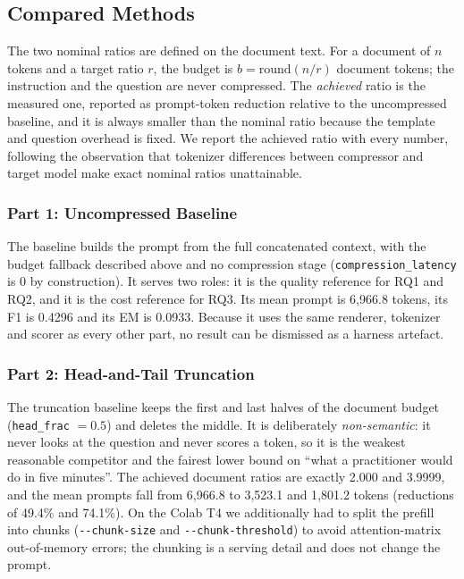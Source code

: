 \documentclass[10pt,a4paper,twocolumn]{article}
\begin{document}
\subsection{Compared Methods}

The two nominal ratios are defined on the document text. For a document of $n$
tokens and a target ratio $r$, the budget is $b=\mathrm{round}(n/r)$ document
tokens; the instruction and the question are never compressed. The \emph{achieved}
ratio is the measured one, reported as prompt-token reduction relative to the
uncompressed baseline, and it is always smaller than the nominal ratio because the
template and question overhead is fixed. We report the achieved ratio with every
number, following the observation that tokenizer differences between compressor
and target model make exact nominal ratios unattainable.

\subsubsection{Part 1: Uncompressed Baseline}

The baseline builds the prompt from the full concatenated context, with the budget
fallback described above and no compression stage (\texttt{compression\_latency}
is 0 by construction). It serves two roles: it is the quality reference for RQ1
and RQ2, and it is the cost reference for RQ3. Its mean prompt is 6{,}966.8
tokens, its F1 is 0.4296 and its EM is 0.0933. Because it uses the same renderer,
tokenizer and scorer as every other part, no result can be dismissed as a
harness artefact.

\subsubsection{Part 2: Head-and-Tail Truncation}

The truncation baseline keeps the first and last halves of the document budget
(\texttt{head\_frac} $=0.5$) and deletes the middle. It is deliberately
\emph{non-semantic}: it never looks at the question and never scores a token, so it
is the weakest reasonable competitor and the fairest lower bound on ``what a
practitioner would do in five minutes''. The achieved document ratios are exactly
2.000 and 3.9999, and the mean prompts fall from 6{,}966.8 to 3{,}523.1 and
1{,}801.2 tokens (reductions of 49.4\% and 74.1\%). On the Colab T4 we additionally
had to split the prefill into chunks (\texttt{-{}-chunk-size} and
\texttt{-{}-chunk-threshold}) to avoid attention-matrix out-of-memory errors; the
chunking is a serving detail and does not change the prompt.
\end{document}
